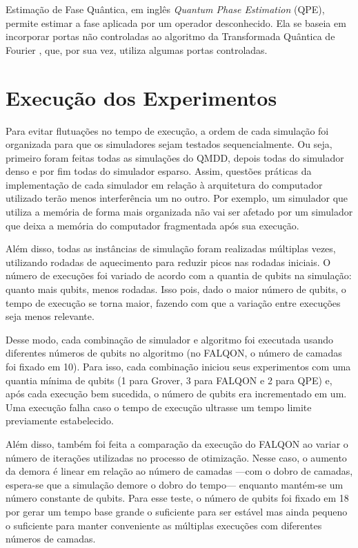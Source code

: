Estimação de Fase Quântica, em inglês {\itshape Quantum Phase Estimation} (QPE), permite estimar a fase aplicada por um operador desconhecido. Ela se baseia em incorporar portas não controladas ao algoritmo da Transformada Quântica de Fourier \cite{coppersmith1994qft}, que, por sua vez, utiliza algumas portas controladas. \cite{kitaev1995qpe}

\section{Execução dos Experimentos}\label{sec:execution}

Para evitar flutuações no tempo de execução, a ordem de cada simulação foi organizada para que os simuladores sejam testados sequencialmente. Ou seja, primeiro foram feitas todas as simulações do QMDD, depois todas do simulador denso e por fim todas do simulador esparso. Assim, questões práticas da implementação de cada simulador em relação à arquitetura do computador utilizado terão menos interferência um no outro. Por exemplo, um simulador que utiliza a memória de forma mais organizada não vai ser afetado por um simulador que deixa a memória do computador fragmentada após sua execução.

Além disso, todas as instâncias de simulação foram realizadas múltiplas vezes, utilizando rodadas de aquecimento para reduzir picos nas rodadas iniciais. O número de execuções foi variado de acordo com a quantia de qubits na simulação: quanto mais qubits, menos rodadas. Isso pois, dado o maior número de qubits, o tempo de execução se torna maior, fazendo com que a variação entre execuções seja menos relevante.

Desse modo, cada combinação de simulador e algoritmo foi executada usando diferentes números de qubits no algoritmo (no FALQON, o número de camadas foi fixado em 10). Para isso, cada combinação iniciou seus experimentos com uma quantia mínima de qubits (1 para Grover, 3 para FALQON e 2 para QPE) e, após cada execução bem sucedida, o número de qubits era incrementado em um. Uma execução falha caso o tempo de execução ultrasse um tempo limite previamente estabelecido.

Além disso, também foi feita a comparação da execução do FALQON ao variar o número de iterações utilizadas no processo de otimização. Nesse caso, o aumento da demora é linear em relação ao número de camadas ---com o dobro de camadas, espera-se que a simulação demore o dobro do tempo--- enquanto mantém-se um número constante de qubits. Para esse teste, o número de qubits foi fixado em 18 por gerar um tempo base grande o suficiente para ser estável mas ainda pequeno o suficiente para manter conveniente as múltiplas execuções com diferentes números de camadas.


